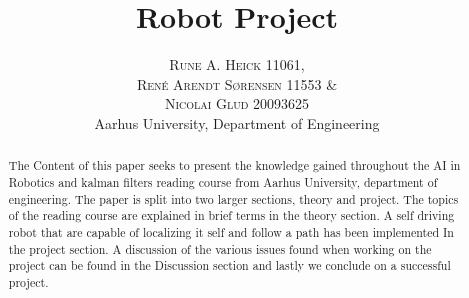 


\title{\vspace{-15mm}\fontsize{24pt}{10pt}\selectfont\textbf{Robot Project}} %

\author{
\large
\textsc{Rune A. Heick 11061,}\\
\textsc{René Arendt Sørensen 11553 \&} \\ 
\textsc{Nicolai Glud 20093625}\\[2mm] %
\normalsize Aarhus University, Department of Engineering \\ %
\vspace{-5mm}
}
\date{}



\setlength{\abovedisplayskip}{1cm}
\setlength{\belowdisplayskip}{.8cm}
\maketitle %

\newpage

\begin{abstract}
The Content of this paper seeks to present the knowledge gained throughout the AI in Robotics and kalman filters reading course from Aarhus University, department of engineering. The paper is split into two larger sections,  theory and project. The topics of the reading course are explained in brief terms in the theory section.  A self driving robot that are capable of localizing it self and follow a path has been implemented In the project section. A discussion of the various issues found when working on the project can be found in the Discussion section and lastly we conclude on a successful project.
\end{abstract}
\tableofcontents


